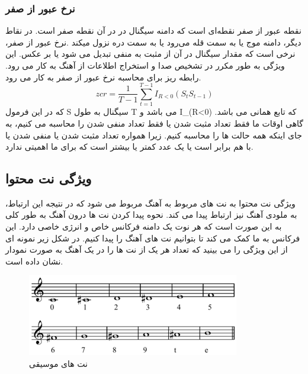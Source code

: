 \documentclass[conference]{IEEEtran}
\begin{document}
    \subsubsection{ نرخ عبور از صفر      }
نقطه عبور از صفر نقطه‌ای است که دامنه سیگنال در در آن نقطه صفر است. در نقاط دیگر، دامنه  موج یا به سمت قله می‌رود یا به سمت دره نزول میکند .نرخ عبور از صفر، نرخی است که مقدار سیگنال در آن از مثبت به منفی تبدیل می شود یا بر عکس. این ویژگی به طور مکرر در تشخیص صدا و استخراج اطلاعات از آهنگ به کار می رود. 
رابطه ریز برای محاسبه نرخ عبور از صفر به کار می رود.
\begin{equation}
    zcr=\frac{1}{T-1}\sum_{t=1}^{T-1}I_{R<0} (S_t S_{t-1})
\end{equation}
که در این فرمول S سیگنال به طول T می باشد و I_(R<0) که تابع همانی می باشد. گاهی اوقات ما فقط تعداد مثبت شدن یا فقط تعداد منفی شدن را محاسبه می کنیم، به جای اینکه همه حالت ها را محاسبه کنیم. زیرا همواره تعداد مثبت شدن یا منفی شدن یا با هم برابر است یا یک عدد کمتر یا بیشتر است که برای ما اهمیتی ندارد.
    \subsection{ ویژگی نت محتوا       }
ویژگی نت محتوا به نت های مربوط به آهنگ مربوط می شود که در نتیجه این ارتباط، به ملودی آهنگ نیز ارتباط پیدا می کند. نحوه پیدا کردن نت ها درون آهنگ به طور کلی به این صورت است که هر نوت یک دامنه فرکانس خاص و انرژی خاصی دارد. این فرکانس به ما کمک می کند تا بتوانیم نت های آهنگ را پیدا کنیم. در شکل زیر نمونه ای از این ویژگی را می بینید که تعداد هر یک از نت ها را در یک آهنگ به صورت نمودار نشان داده است.
\begin{figure}[h!]
\includegraphics[width=\linewidth]{7.png}
      \caption{ نت های موسیقی }
      \label{fig:fig 1}
    \end{figure}
\end{document}
